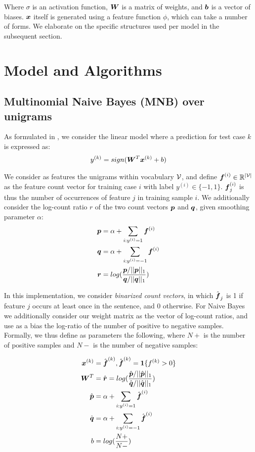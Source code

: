 \documentclass[11pt]{article}
\begin{document}
Where $\sigma$ is an activation function, $\boldsymbol{W}$ is a matrix of weights, and $\boldsymbol{b}$ is a vector of biases. $\boldsymbol{x}$ itself is generated using a feature function $\phi$, which can take a number of forms. We elaborate on the specific structures used per model in the subsequent section.

\section{Model and Algorithms}

\subsection{Multinomial Naive Bayes (MNB) over unigrams}

As formulated in \cite{wang2012baselines}, we consider the linear model where a prediction for test case $k$ is expressed as:
\begin{align}
  y^{(k)} = sign(\boldsymbol{W}^{T}\boldsymbol{x}^{(k)} + b)
\end{align}

We consider as features the unigrams within vocabulary $\mathcal{V}$, and define $\boldsymbol{f}^{(i)} \in \mathbb{R}^{|\mathcal{V}|}$ as the feature count vector for training case $i$ with label $y^{(i)} \in \{-1, 1\}$. $\boldsymbol{f}^{(i)}_j$ is thus the number of occurrences of feature $j$ in training sample $i$. We additionally consider the log-count ratio $r$ of the two count vectors $\boldsymbol{p}$ and $\boldsymbol{q}$, given smoothing parameter $\alpha$:
\begin{align}
  \boldsymbol{p} &= \alpha + \sum_{i:y^{(i)}=1}{\boldsymbol{f}^{(i)}} \\
  \boldsymbol{q} &= \alpha + \sum_{i:y^{(i)}=-1}{\boldsymbol{f}^{(i)}} \\
  \boldsymbol{r} &= log(\frac{\boldsymbol{p} / ||\boldsymbol{p}||_1}{\boldsymbol{q} / ||\boldsymbol{q}||_1})
\end{align}

In this implementation, we consider \textit{binarized count vectors}, in which $\hat{\boldsymbol{f}}_j$ is 1 if feature $j$ occurs at least once in the sentence, and 0 otherwise. For Naive Bayes we additionally consider our weight matrix as the vector of log-count ratios, and use as a bias the log-ratio of the number of positive to negative samples. Formally, we thus define as parameters the following, where $N+$ is the number of positive samples and $N-$ is the number of negative samples:

\begin{align}
  \boldsymbol{x}^{(k)} &= \hat{\boldsymbol{f}}^{(k)}, \hat{\boldsymbol{f}}^{(k)} = \textbf{1}\{f^{(k)} > 0\} \\
  \boldsymbol{W}^T &= \hat{\boldsymbol{r}} = log(\frac{\hat{\boldsymbol{p}} / ||\hat{\boldsymbol{p}}||_1}{\hat{\boldsymbol{q}} / ||\hat{\boldsymbol{q}}||_1}) \\
  \hat{\boldsymbol{p}} &= \alpha + \sum_{i:y^{(i)}=1}{\hat{\boldsymbol{f}}^{(i)}} \\
  \hat{\boldsymbol{q}} &= \alpha + \sum_{i:y^{(i)}=-1}{\hat{\boldsymbol{f}}^{(i)}} \\
  b &= log(\frac{N+}{N-})
\end{align}
\end{document}

